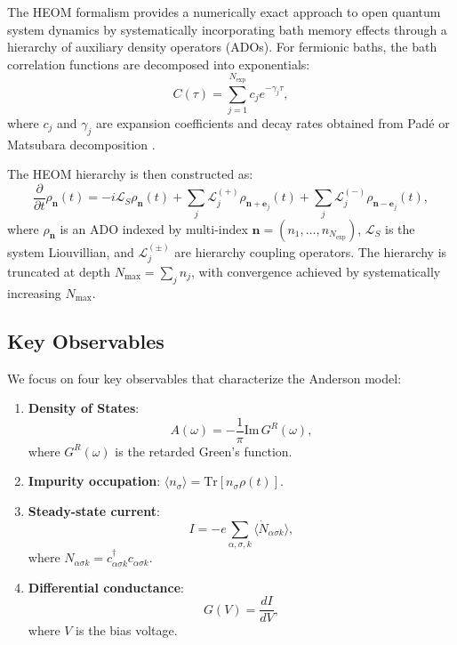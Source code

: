 \documentclass[preprint,1p]{elsarticle}
\begin{document}
The HEOM formalism \cite{tanimura2020numerically} provides a numerically exact approach to open quantum system dynamics by systematically incorporating bath memory effects through a hierarchy of auxiliary density operators (ADOs). For fermionic baths, the bath correlation functions are decomposed into exponentials:
\begin{equation}
C(\tau) = \sum_{j=1}^{N_{\text{exp}}} c_j e^{-\gamma_j \tau},
\label{eq:bath_correlation}
\end{equation}
where $c_j$ and $\gamma_j$ are expansion coefficients and decay rates obtained from Padé or Matsubara decomposition \cite{tanimura2020numerically}.

The HEOM hierarchy is then constructed as:
\begin{equation}
\frac{\partial}{\partial t} \rho_{\mathbf{n}}(t) = -i \mathcal{L}_S \rho_{\mathbf{n}}(t) + \sum_j \mathcal{L}_j^{(+)} \rho_{\mathbf{n}+\mathbf{e}_j}(t) + \sum_j \mathcal{L}_j^{(-)} \rho_{\mathbf{n}-\mathbf{e}_j}(t),
\label{eq:heom}
\end{equation}
where $\rho_{\mathbf{n}}$ is an ADO indexed by multi-index $\mathbf{n} = (n_1, \ldots, n_{N_{\text{exp}}})$, $\mathcal{L}_S$ is the system Liouvillian, and $\mathcal{L}_j^{(\pm)}$ are hierarchy coupling operators. The hierarchy is truncated at depth $N_{\text{max}} = \sum_j n_j$, with convergence achieved by systematically increasing $N_{\text{max}}$.

\subsection{Key Observables}

We focus on four key observables that characterize the Anderson model:

\begin{enumerate}
    \item \textbf{Density of States}:
    \begin{equation}
    A(\omega) = -\frac{1}{\pi} \text{Im} \, G^R(\omega),
    \end{equation}
    where $G^R(\omega)$ is the retarded Green's function.
    
    \item \textbf{Impurity occupation}: $\langle n_\sigma \rangle = \text{Tr}[n_\sigma \rho(t)]$.
    
    \item \textbf{Steady-state current}:
    \begin{equation}
    I = -e \sum_{\alpha, \sigma, k} \langle \dot{N}_{\alpha \sigma k} \rangle,
    \end{equation}
    where $N_{\alpha \sigma k} = c_{\alpha \sigma k}^\dagger c_{\alpha \sigma k}$.
    
    \item \textbf{Differential conductance}:
    \begin{equation}
    G(V) = \frac{dI}{dV},
    \end{equation}
    where $V$ is the bias voltage.
\end{enumerate}
\end{document}
